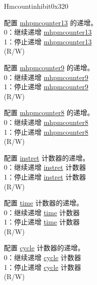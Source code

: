 \begin{register}{H}{mcountinhibit}{0x320}\label{regdesc:MCOUNTINHIBIT}
%
%
%
%
%
%
%
%
%
\regnewline%
\begin{regdesc}\begin{reglist}
\label{fielddesc:MCOUNTERINH_HPM_13}\item [{HPM13}] 配置 \hyperref[regdesc:MHPMCOUNTER13] {mhpmcounter13} 的递增。 \\
0：继续递增 \hyperref[regdesc:MHPMCOUNTER13] {mhpmcounter13}\\
1：停止递增 \hyperref[regdesc:MHPMCOUNTER13] {mhpmcounter13} \\
(R/W)
\label{fielddesc:MCOUNTERINH_HPM_9}\item [{HPM9}] 配置 \hyperref[regdesc:MHPMCOUNTER9] {mhpmcounter9} 的递增。\\
0：继续递增 \hyperref[regdesc:MHPMCOUNTER9] {mhpmcounter9}\\
1：停止递增 \hyperref[regdesc:MHPMCOUNTER9] {mhpmcounter9} \\
(R/W) 
\label{fielddesc:MCOUNTERINH_HPM_8}\item [{HPM8}] 配置 \hyperref[regdesc:MHPMCOUNTER8] {mhpmcounter8} 的递增。\\
0：继续递增 \hyperref[regdesc:MHPMCOUNTER8] {mhpmcounter8}\\
1：停止递增 \hyperref[regdesc:MHPMCOUNTER8] {mhpmcounter8} \\
(R/W) 
\label{fielddesc:MCOUNTINHIBIT_IR}\item [IR] 配置 \hyperref[regdesc:INSTRET]{instret} 计数器的递增。 \\
0：继续递增 \hyperref[regdesc:INSTRET]{instret} 计数器\\
1：停止递增 \hyperref[regdesc:INSTRET]{instret} 计数器 \\
(R/W) \\
\label{fielddesc:MCOUNTINHIBIT_TM}\item [TM] 配置 \hyperref[regdesc:TIME]{time} 计数器的递增。 \\
0：继续递增 \hyperref[regdesc:TIME]{time} 计数器\\
1：停止递增 \hyperref[regdesc:TIME]{time} 计数器 \\
(R/W) \\
\label{fielddesc:MCOUNTINHIBIT_CY}\item [CY] 配置 \hyperref[regdesc:CYCLE]{cycle} 计数器的递增。 \\
0：继续递增 \hyperref[regdesc:CYCLE]{cycle} 计数器\\
1：停止递增 \hyperref[regdesc:CYCLE]{cycle} 计数器\\
(R/W)\\
\end{reglist}\end{regdesc}
\end{register}

